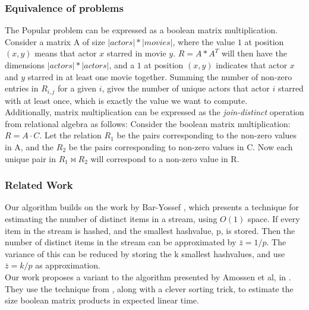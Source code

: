 \documentclass[a4paper,11pt]{article}
\begin{document}
\subsubsection{Equivalence of problems}
The Popular problem can be expressed as a boolean matrix multiplication. Consider a matrix A of size $|actors|*|movies|$, where the value $1$ at position $(x, y)$ means that actor $x$ starred in movie $y$. $R = A * A^T$ will then have the dimensions $|actors|*|actors|$, and a $1$ at position $(x, y)$ indicates that actor $x$ and $y$ starred in at least one movie together. Summing the number of non-zero entries in $R_{i,j}$ for a given $i$, gives the number of unique actors that actor $i$ starred with at least once, which is exactly the value we want to compute.\\
Additionally, matrix multiplication can be expressed as the \emph{join-distinct} operation from relational algebra as follows: Consider the boolean matrix multiplication: $R = A \cdot C$. Let the relation $R_1$ be the pairs corresponding to the non-zero values in A, and the $R_2$ be the pairs corresponding to non-zero values in C. Now each unique pair in $R_1 \Join R_2$ will correspond to a non-zero value in R.

\subsubsection{Related Work}
Our algorithm builds on the work by Bar-Yossef \cite{paper:bar-yos}, which presents a technique for estimating the number of distinct items in a stream, using $O(1)$ space. If every item in the stream is hashed, and the smallest hashvalue, p, is stored. Then the number of distinct items in the stream can be approximated by $\bar{z}=1/p$. The variance of this can be reduced by storing the k smallest hashvalues, and use $\bar{z}=k/p$ as approximation.\\

Our work proposes a variant to the algorithm presented by Amossen et al, in \cite{paper:amossen}. They use the technique from \cite{paper:bar-yos}, along with a clever sorting trick, to estimate the size boolean matrix products in expected linear time.

\end{document}
